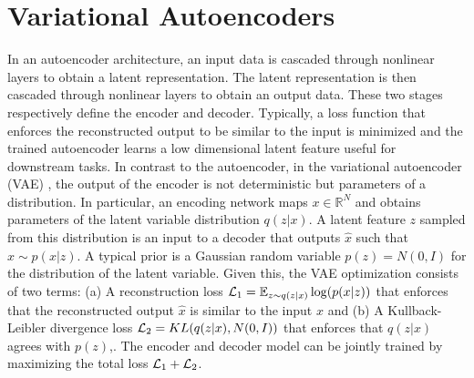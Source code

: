 \documentclass{article}
\def\R{\mathbb{R}}
\def\L{{\cal L}}
\def\L{{\cal L}}
\def\R{{\mathbb R}}
\def\E{{\mathbb E}}
\begin{document}

\section{Variational Autoencoders }

In an autoencoder architecture, an input data is  cascaded through nonlinear layers to obtain a latent representation. The latent representation is then cascaded  through nonlinear layers to obtain an output data. These two stages respectively define the encoder and decoder. Typically, a loss function that enforces the reconstructed output to be similar to the input is minimized and the trained autoencoder learns
a low dimensional latent feature useful for downstream tasks. In contrast to the autoencoder, in the variational autoencoder (VAE) \cite{kingma2014auto}, the output of the encoder is not deterministic but parameters of a distribution.  In particular, an encoding network maps $x \in \R^N $  and obtains parameters of the latent variable distribution $q(z|x)$. A latent feature $z$  sampled from this distribution is an input to a decoder that outputs $\hat{x}$ such that $\hat{x}\sim p(x|z)$. A typical prior is a Gaussian random variable $p(z)=N(0,I)$ for the distribution of the latent variable. Given this, the VAE optimization consists of two terms: (a) A reconstruction loss $\L_1=  \E_{z \sim q(z|x)} \log(p(x|z))$ that enforces that the reconstructed output $\hat{x}$ is similar to the input $x$ and (b) A Kullback-Leibler divergence loss $\L_2 =  KL(q(z|x),N(0,I))$   that enforces that $q(z|x)$ agrees with $p(z)$,. The encoder and decoder model can be jointly trained by maximizing the total loss $\L_1+\L_2$. 


\end{document}
